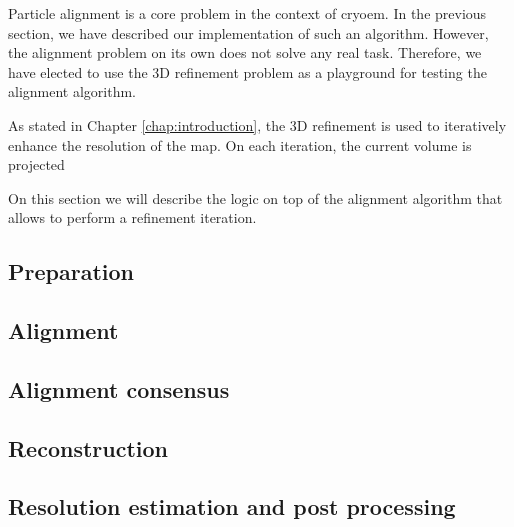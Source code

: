 \documentclass[../main.tex]{subfiles}
\begin{document}
Particle alignment is a core problem in the context of \gls{cryoem}. In the previous section, we have described our implementation of such an algorithm. However, the alignment problem on its own does not solve any real task. Therefore, we have elected to use the 3D refinement problem as a playground for testing the alignment algorithm.

As stated in Chapter \ref{chap:introduction}, the 3D refinement is used to iteratively enhance the resolution of the map. On each iteration, the current volume is projected 

On this section we will describe the logic on top of the alignment algorithm that allows to perform a refinement iteration.

\subsection{Preparation}

\subsection{Alignment}

\subsection{Alignment consensus}

\subsection{Reconstruction}

\subsection{Resolution estimation and post processing}
\end{document}
